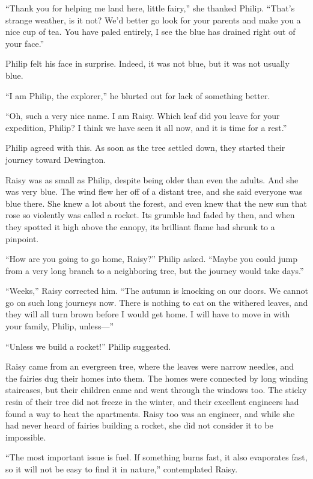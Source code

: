 \documentclass[10pt, draft]{memoir}
\begin{document}
``Thank you for helping me land here, little fairy,'' she thanked Philip.
``That's strange weather, is it not? We'd better go look for your parents and
make you a nice cup of tea. You have paled entirely, I see the blue has drained
right out of your face.''

Philip felt his face in surprise. Indeed, it was not blue, but it was not
usually blue.

``I am Philip, the explorer,'' he blurted out for lack of something better.

``Oh, such a very nice name. I am Raisy. Which leaf did you leave for your
expedition, Philip? I think we have seen it all now, and it is time for a
rest.''

Philip agreed with this. As soon as the tree settled down, they started their
journey toward Dewington.

Raisy was as small as Philip, despite being older than even the adults. And she
was very blue. The wind flew her off of a distant tree, and she said everyone
was blue there. She knew a lot about the forest, and even knew that the new sun
that rose so violently was called a rocket. Its grumble had faded by then, and
when they spotted it high above the canopy, its brilliant flame had shrunk to a
pinpoint.

``How are you going to go home, Raisy?'' Philip asked. ``Maybe you could jump
from a very long branch to a neighboring tree, but the journey would take
days.''

``Weeks,'' Raisy corrected him. ``The autumn is knocking on our doors. We
cannot go on such long journeys now. There is nothing to eat on the withered
leaves, and they will all turn brown before I would get home. I will have to
move in with your family, Philip, unless---''

``Unless we build a rocket!'' Philip suggested.

Raisy came from an evergreen tree, where the leaves were narrow needles, and
the fairies dug their homes into them. The homes were connected by long winding
staircases, but their children came and went through the windows too. The
sticky resin of their tree did not freeze in the winter, and their excellent
engineers had found a way to heat the apartments. Raisy too was an engineer,
and while she had never heard of fairies building a rocket, she did not
consider it to be impossible.

``The most important issue is fuel. If something burns fast, it also evaporates
fast, so it will not be easy to find it in nature,'' contemplated Raisy.
\end{document}
